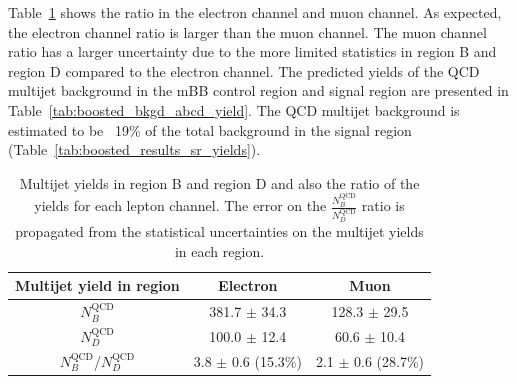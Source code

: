 Table~\ref{tab:boosted_bkgd_abcd_ratio} shows the ratio in the electron channel and muon channel. As expected,
the electron channel ratio is larger than the muon channel. The muon channel ratio has a larger uncertainty due to
the more limited statistics in region B and region D compared to the electron channel. The predicted yields of the QCD multijet background
in the mBB control region and signal region are presented in Table~\ref{tab:boosted_bkgd_abcd_yield}. The QCD multijet background is
estimated to be ~19\% of the total background in the signal region (Table~\ref{tab:boosted_results_sr_yields}).
 
\begin{table}
\begin{center}
\begin{tabular}{c|c|c}
Multijet yield in region              & Electron                & Muon   \\      
\hline
$N_B^\text{QCD}$                      & 381.7 $\pm$ 34.3      & 128.3 $\pm$ 29.5 \\
$N_D^\text{QCD}$                      & 100.0 $\pm$ 12.4      & 60.6 $\pm$ 10.4  \\
\hline
$N_{B}^\text{QCD}$/$N_{D}^\text{QCD}$     & 3.8 $\pm$ 0.6 (15.3\%) & 2.1 $\pm$ 0.6 (28.7\%)   \\
\end{tabular}
\end{center}
\caption[Multijet yields in region B and region D and also the ratio of the yields for each lepton channel]{Multijet yields in region B and region D and also the ratio of the yields for each lepton channel. The error
on the $\frac{N_B^\text{QCD}}{N_D^\text{QCD}}$ ratio is propagated from the statistical uncertainties on the multijet yields in each region.}
\label{tab:boosted_bkgd_abcd_ratio}
\end{table}
 
